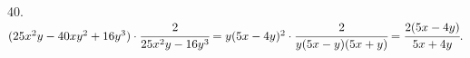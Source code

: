 40. $(25x^2y-40xy^2+16y^3)\cdot\cfrac{2}{25x^2y-16y^3}=y(5x-4y)^2\cdot\cfrac{2}{y(5x-y)(5x+y)}=\cfrac{2(5x-4y)}{5x+4y}.$\\
